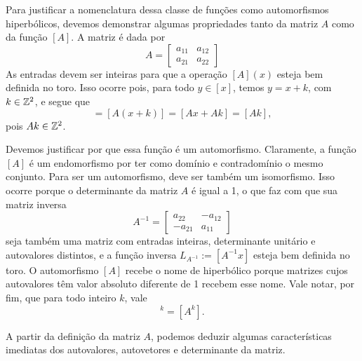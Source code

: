 Para justificar a nomenclatura dessa classe de funções como automorfismos hiperbólicos, devemos demonstrar algumas propriedades tanto da matriz $A$ como da função $[A]$. A matriz é dada por
	\begin{equation*}
	A = \begin{bmatrix}
		a_{11} & a_{12} \\
		a_{21} & a_{22}
		\end{bmatrix}
	\end{equation*}
As entradas devem ser inteiras para que a operação $[A](x)$ esteja bem definida no toro. Isso ocorre pois, para todo $y \in [x]$, temos $y = x + k$, com $k \in \mathbb{Z}^2$, e segue que
	\begin{equation*}
	[Ay] = [A(x+k)] = [Ax + Ak] = [Ak],
	\end{equation*}
pois $Ak \in \mathbb{Z}^2$.

Devemos justificar por que essa função é um automorfismo. Claramente, a função $[A]$ é um endomorfismo por ter como domínio e contradomínio o mesmo conjunto. Para ser um automorfismo, deve ser também um isomorfismo. Isso ocorre porque o determinante da matriz $A$ é igual a 1, o que faz com que sua matriz inversa
	\begin{equation*}
	A^{-1} = \begin{bmatrix}
		a_{22} & -a_{12} \\
		-a_{21} & a_{11}
		\end{bmatrix}
	\end{equation*}
seja também uma matriz com entradas inteiras, determinante unitário e autovalores distintos, e a função inversa $L_{A^{-1}} := [A^{-1}x]$ esteja bem definida no toro. O automorfismo $[A]$ recebe o nome de hiperbólico porque matrizes cujos autovalores têm valor absoluto diferente de 1 recebem esse nome. Vale notar, por fim, que para todo inteiro $k$, vale
	\begin{equation*}
	[A]^k = [A^k].
	\end{equation*}

A partir da definição da matriz $A$, podemos deduzir algumas características imediatas dos autovalores, autovetores e determinante da matriz.


